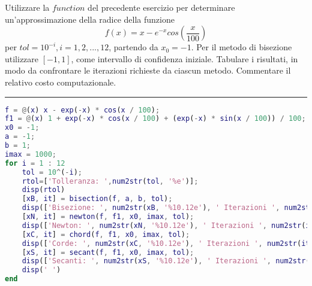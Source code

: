Utilizzare la $function$ del precedente esercizio per determinare un'approssimazione della
radice della funzione
$$f(x)=x-e^{-x}cos(\frac{x}{100})$$
per $tol=10^{-i}, i=1,2,...,12$, partendo da $x_\mathrm{0}=-1$. Per il metodo di bisezione utilizzare
$[-1,1]$, come intervallo di confidenza iniziale. Tabulare i risultati, in modo da confrontare le iterazioni
richieste da ciascun metodo. Commentare il relativo costo computazionale.

\hspace*{\fill}
\par\noindent\rule{\textwidth}{0.4pt}
\hspace*{\fill}

\begin{lstlisting}[language=Matlab, caption=Codice Matlab]
f = @(x) x - exp(-x) * cos(x / 100);
f1 = @(x) 1 + exp(-x) * cos(x / 100) + (exp(-x) * sin(x / 100)) / 100;
x0 = -1;
a = -1;
b = 1;
imax = 1000;
for i = 1 : 12
	tol = 10^(-i);
	rtol=['Tolleranza: ',num2str(tol, '%e')];
	disp(rtol)
	[xB, it] = bisection(f, a, b, tol);
	disp(['Bisezione: ', num2str(xB, '%10.12e'), ' Iterazioni ', num2str(it)])
	[xN, it] = newton(f, f1, x0, imax, tol);
	disp(['Newton: ', num2str(xN, '%10.12e'), ' Iterazioni ', num2str(it)])
	[xC, it] = chord(f, f1, x0, imax, tol);
	disp(['Corde: ', num2str(xC, '%10.12e'), ' Iterazioni ', num2str(it)])
	[xS, it] = secant(f, f1, x0, imax, tol);
	disp(['Secanti: ', num2str(xS, '%10.12e'), ' Iterazioni ', num2str(it)])
	disp(' ')
end
\end{lstlisting}

